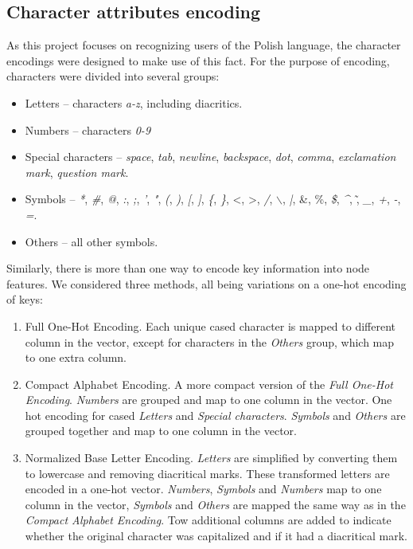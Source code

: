 \subsection{Character attributes encoding}
\label{Base_letter_representation}
As this project focuses on recognizing users of the Polish language, the character encodings were designed to make use of this fact. For the purpose of encoding, characters were divided into several groups:\\
\begin{itemize}
	\item Letters -- characters \textit{a-z}, including diacritics.
	\item Numbers -- characters \textit{0-9}
	\item Special characters -- \textit{space}, \textit{tab}, \textit{newline}, \textit{backspace}, \textit{dot}, \textit{comma}, \textit{exclamation mark}, \textit{question mark}.
	\item Symbols -- \textit{*}, \textit{\#}, \textit{@}, \textit{:}, \textit{;},   \textit{'}, \textit{"}, \textit{(}, \textit{)}, \textit{[}, \textit{]}, \textit{\{}, \textit{\}}, \textless, \textgreater, \textit{/}, \textit{$\backslash$}, \textit{|}, \&, \%, \textit{\$}, \textit{\^}, \~, \textit{\_}, \textit{+}, \textit{-}, \textit{=}. 
	\item Others -- all other symbols.
\end{itemize}
Similarly, there is more than one way to encode key information into node features.
We considered three methods, all being variations on a one-hot encoding of keys:
\begin{enumerate}
	\item Full One-Hot Encoding. Each unique cased character is mapped to different column in the vector, except for characters in the \textit{Others} group, which map to one extra column.\\
	\item Compact Alphabet Encoding. A more compact version of the \textit{Full One-Hot Encoding}. \textit{Numbers} are grouped and map to one column in the vector.
	One hot encoding for cased \textit{Letters} and \textit{Special characters}.
	\textit{Symbols} and \textit{Others} are grouped together and map to one column in the vector.\\
	\item Normalized Base Letter Encoding. \textit{Letters} are simplified by converting them to lowercase and removing diacritical marks. These transformed letters are encoded in a one-hot vector. \textit{Numbers}, \textit{Symbols} and 
	\textit{Numbers} map to one column in the vector, \textit{Symbols} and \textit{Others} are mapped the same way as in the \textit{Compact Alphabet Encoding}. Tow additional columns are added to indicate whether the original character was capitalized and if it had a diacritical mark.
\end{enumerate}


